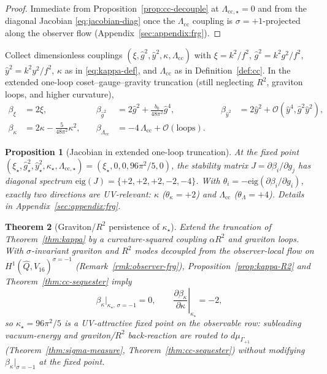 \documentclass[11pt]{article}
\theoremstyle{plain}
\newtheorem{theorem}{Theorem}[section]
\newtheorem{proposition}[theorem]{Proposition}
\theoremstyle{definition}
\theoremstyle{remark}
\numberwithin{equation}{section}
\begin{document}
\begin{proof}
Immediate from Proposition~\ref{prop:cc-decouple} at
$\Lambda_{\mathrm{cc},\star}=0$ and from the diagonal Jacobian
\eqref{eq:jacobian-diag} once the $\Lambda_{\mathrm{cc}}$ coupling is
$\sigma=+1$-projected along the observer flow
(Appendix~\ref{sec:appendix:frg}).
\end{proof}

Collect dimensionless couplings
$(\xi,\hat g^2,\hat y^2,\kappa,\Lambda_{\mathrm{cc}})$ with
$\xi=k^2/f^2$, $\hat g^2=k^2 g^2/f^2$, $\hat y^2=k^2 y^2/f^2$,
$\kappa$ as in \eqref{eq:kappa-def}, and $\Lambda_{\mathrm{cc}}$ as in
Definition~\ref{def:cc}. In the extended one-loop coset--gauge--gravity
truncation (still neglecting $R^2$, graviton loops, and higher curvature),
\begin{equation}\label{eq:frg-system}
\begin{aligned}
  \beta_{\xi}&=2\xi,
  &\quad
  \beta_{\hat g^2}&=2\hat g^2+\frac{b_0}{48\pi^2}\hat g^4,
  &\quad
  \beta_{\hat y^2}&=2\hat y^2+\mathcal{O}(\hat y^4,\hat g^2\hat y^2),
  \\[4pt]
  \beta_{\kappa}&=2\kappa-\frac{5}{48\pi^2}\kappa^2,
  &\quad
  \beta_{\Lambda_{\mathrm{cc}}}&=-4\,\Lambda_{\mathrm{cc}}+\mathcal{O}(\text{loops}).
\end{aligned}
\end{equation}

\begin{proposition}[Jacobian in extended one-loop truncation]
\label{prop:frg-jacobian}
At the fixed point
$(\xi_\star,\hat g^2_\star,\hat y^2_\star,\kappa_\star,\Lambda_{\mathrm{cc},\star})
=(\xi_\star,0,0,96\pi^2/5,0)$, the stability matrix
$J=\partial\beta_i/\partial g_j$ has diagonal spectrum
$\mathrm{eig}(J)=\{+2,+2,+2,-2,-4\}$. With
$\theta_i=-\mathrm{eig}(\partial\beta_i/\partial g_i)$, exactly two directions
are UV-relevant: $\kappa$ ($\theta_\kappa=+2$) and
$\Lambda_{\mathrm{cc}}$ ($\theta_{\Lambda}=+4$). Details in
Appendix~\ref{sec:appendix:frg}.
\end{proposition}

\begin{theorem}[Graviton/$R^2$ persistence of $\kappa_\star$]
\label{thm:kappa-persistence}
Extend the truncation of Theorem~\ref{thm:kappa} by a curvature-squared
coupling $\alpha R^2$ and graviton loops. With
$\sigma$-invariant graviton and $R^2$ modes decoupled from the observer-local
flow on $H^1(\hat Q,V_{16})^{\sigma=-1}$
(Remark~\ref{rmk:observer-frg}), Proposition~\ref{prop:kappa-R2} and
Theorem~\ref{thm:cc-sequester} imply
\begin{equation}\label{eq:kappa-persist}
  \beta_\kappa\Big|_{\kappa_\star,\,\sigma=-1}=0,
  \qquad
  \left.\frac{\partial\beta_\kappa}{\partial\kappa}\right|_{\kappa_\star}=-2,
\end{equation}
so $\kappa_\star=96\pi^2/5$ is a UV-attractive fixed point on the observable
row: subleading vacuum-energy and graviton/$R^2$ back-reaction are routed to
$d\mu_{\Gamma_{+1}}$ (Theorem~\ref{thm:sigma-measure},
Theorem~\ref{thm:cc-sequester}) without modifying
$\beta_\kappa|_{\sigma=-1}$ at the fixed point.
\end{theorem}
\end{document}
